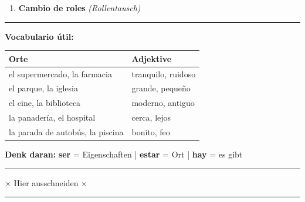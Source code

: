 \documentclass[11pt, a4paper]{article}
\begin{document}
\begin{center}
{\begin{minipage}{0.95\textwidth}
\begin{enumerate}[label=\textbf{\arabic*.}, leftmargin=2em, itemsep=0.5em]
    \vspace{0.3cm}

    \item {\large\bfseries Cambio de roles} \textit{(Rollentausch)}
\end{enumerate}

\vspace{0.5cm}
\hrule
\vspace{0.5cm}

{\Large\bfseries Vocabulario útil:}

\vspace{0.3cm}

\begin{tabularx}{\textwidth}{@{}|X|X|@{}}
\hline
\rowcolor{gruppeA!10}
\textbf{Orte} & \textbf{Adjektive} \\
\hline
el supermercado, la farmacia & tranquilo, ruidoso \\
el parque, la iglesia & grande, pequeño \\
el cine, la biblioteca & moderno, antiguo \\
la panadería, el hospital & cerca, lejos \\
la parada de autobús, la piscina & bonito, feo \\
\hline
\end{tabularx}

\vspace{0.5cm}

\begin{center}
\colorbox{gruppeA!20}{\parbox{0.9\textwidth}{\centering
\textbf{Denk daran:} \textbf{ser} = Eigenschaften | \textbf{estar} = Ort | \textbf{hay} = es gibt
}}
\end{center}

\vspace{0.3cm}
\end{minipage}%
}
\end{center}

\vspace{1cm}

\noindent\rule{\textwidth}{0.5pt}
\begin{center}
\scriptsize\textcolor{grau}{$\times$ Hier ausschneiden $\times$}
\end{center}
\rule{\textwidth}{0.5pt}

\vspace{0.5cm}

\end{document}
